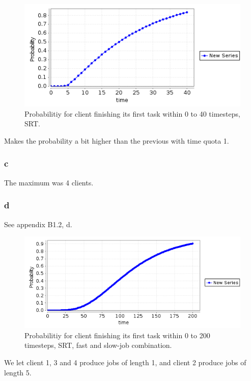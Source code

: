 \begin{figure}[!htb]
\centering
\includegraphics[scale=.75]{images/B1_2_a.png}
\caption{Probabilitiy for client finishing its first task within 0 to 40 timesteps, SRT.}
\label{fig:nojobprop}
\end{figure}

Makes the probability a bit higher than the previous with time quota 1.

\subsubsection{c}

The maximum was 4 clients.

\subsubsection{d}

See appendix B1.2, d.

\begin{figure}[!htb]
\centering
\includegraphics[scale=.75]{images/B1_2_d.png}
\caption{Probabilitiy for client finishing its first task within 0 to 200 timesteps, SRT, fast and slow-job combination.}
\label{fig:nojobprop}
\end{figure}

We let client 1, 3 and 4 produce jobs of length 1, and client 2 produce jobs of length 5.

